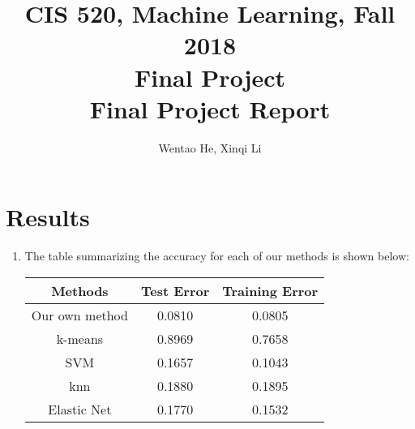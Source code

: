 \documentclass[english]{article}
\title{CIS 520, Machine Learning, Fall 2018\\Final Project\\Final Project Report\\}
\author{Wentao He, Xinqi Li}
\begin{document}
\maketitle

\section{Results}
\begin{enumerate}
    \item The table summarizing the accuracy for each of our methods is shown below:
    \begin{center}
      \begin{tabular}{|c |c |c|}
      \hline
      Methods & Test Error&Training Error\\ [1ex]
      \hline
      Our own method   &      0.0810& 0.0805\\[1ex]
      \hline
      k-means     &   0.8969& 0.7658\\[1ex]
      \hline
      SVM   &      0.1657&0.1043\\[1ex]
      \hline
      knn     &   0.1880&0.1895\\[1ex]
      \hline
      Elastic Net   &   0.1770&0.1532\\[1ex]
      \hline
      \end{tabular}
    \end{center}
\end{enumerate}
\end{document}
